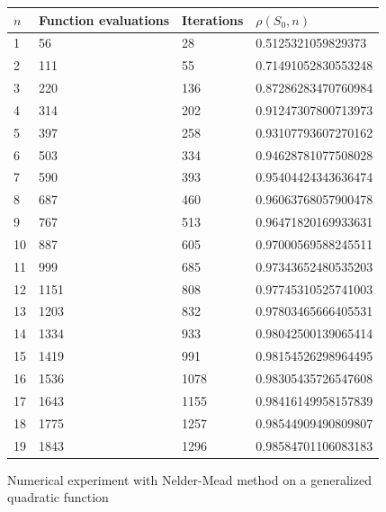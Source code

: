 \begin{figure}[htbp]
\begin{center}
\begin{tabular}{|l|l|l|l|}
\hline
$n$ & Function evaluations & Iterations & $\rho(S_0,n)$\\
\hline
1 & 56 & 28 & 0.5125321059829373\\
2 & 111 & 55 & 0.71491052830553248\\
3 & 220 & 136 & 0.87286283470760984\\
4 & 314 & 202 & 0.91247307800713973\\
5 & 397 & 258 & 0.93107793607270162\\
6 & 503 & 334 & 0.94628781077508028\\
7 & 590 & 393 & 0.95404424343636474\\
8 & 687 & 460 & 0.96063768057900478\\
9 & 767 & 513 & 0.96471820169933631\\
10 & 887 & 605 & 0.97000569588245511\\
11 & 999 & 685 & 0.97343652480535203\\
12 & 1151 & 808 & 0.97745310525741003\\
13 & 1203 & 832 & 0.97803465666405531\\
14 & 1334 & 933 & 0.98042500139065414\\
15 & 1419 & 991 & 0.98154526298964495\\
16 & 1536 & 1078 & 0.98305435726547608\\
17 & 1643 & 1155 & 0.98416149958157839\\
18 & 1775 & 1257 & 0.98544909490809807\\
19 & 1843 & 1296 & 0.98584701106083183\\
\hline
\end{tabular}
\end{center}
\caption{Numerical experiment with Nelder-Mead method on a generalized quadratic function}
\label{fig-nm-numexp3-dimension}
\end{figure}

